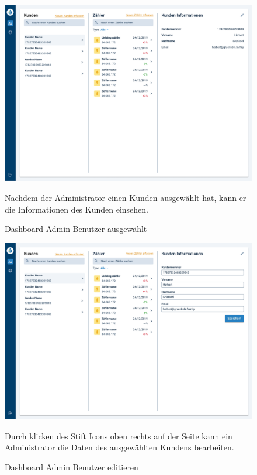 \newpage

\begin{figure}[h]
	\centering
    \includegraphics[scale=0.3]{img/WebsiteMockup/Dashboard-Admin-UserSelected}
	\caption{Dashboard Admin Benutzer ausgewählt} \hfill \break
	Nachdem der Administrator einen Kunden ausgewählt hat, kann er die Informationen des Kunden einsehen.
\end{figure}

\newpage

\begin{figure}[h]
	\centering
    \includegraphics[scale=0.3]{img/WebsiteMockup/Dashboard-Admin-UserSelected-Edit}
	\caption{Dashboard Admin Benutzer editieren}\hfill \break
	Durch klicken des Stift Icons oben rechts auf der Seite kann ein Administrator die Daten des ausgewählten Kundens bearbeiten.
\end{figure}
\newpage

